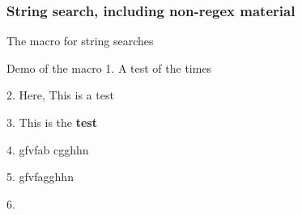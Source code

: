 \documentclass[10pt]{article}
\begin{document}
\endgroup

\subsubsection{String search, including non-regex material\label{s:searchA}}

\begingroup

\begin{exampleC}[]{The  macro for string searches}
\newcommand\findinstring[2]{\begingroup%
  \stripgroupingtrue
  \setcounter{runcount}{0}%
  \tokcycle
    {\nextctltok{##1}}
    {\nextctltok{\opengroup}\processtoks{##1}\nextctltok{\closegroup}}
    {\nextctltok{##1}}
    {\nextctltok{\tcspace}}
    {#1}%
  \edef\numlet{\theruncount}%
  \expandafter\def\expandafter\searchword\expandafter{\the\cytoks}%
%
  \aftertokcycle{\matchfound}%
  \setcounter{runcount}{0}%
  \def\matchfound{F}%
  \tokcycle
    {\nextcmptok{##1}}
    {\nextcmptok{\opengroup}\processtoks{##1}\nextcmptok{\closegroup}}
    {\nextcmptok{##1}}
    {\nextcmptok{\tcspace}}
    {#2}%
\endgroup}
\makeatletter
\newcommand\rotcytoks[1]{\cytoks\expandafter\expandafter\expandafter{%
  \expandafter\tc@gobble\the\cytoks#1}}
\makeatother
\newcommand\testmatch[1]{\ifx#1\searchword\gdef\matchfound{T}\fi}%
\newcommand\rotoradd[2]{\stepcounter{runcount}%
  \ifnum\theruncount>\numlet\relax#1\else#2\fi
  \expandafter\def\expandafter\tmp\expandafter{\the\cytoks}}
\newcommand\nextcmptok[1]{\rotoradd{\rotcytoks{#1}}{\addcytoks{#1}}\testmatch{\tmp}}
\newcommand\nextctltok[1]{\stepcounter{runcount}\addcytoks{#1}}
\end{exampleC}

\begin{exampleA}[lefthand width=11.5cm]{Demo of the 
   macro}
1. 
    {A test of the times}\par
2. 
    {Here, This is a test}\par
3.         {This is the\bfseries{} test}
   \par
4.  {gf{vf{a{b c}g}gh}hn}
   \par
5. 
      {gf{vf{ag}gh}hn}\par
6. 
\end{exampleA}
\end{document}
